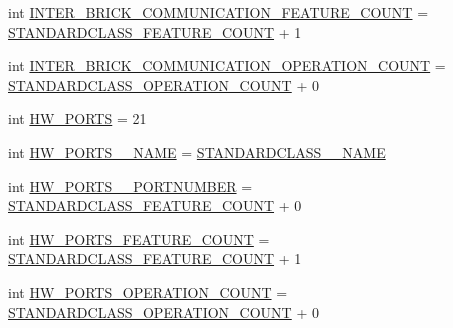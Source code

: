 \begin{DoxyCompactItemize}
\item 
int \hyperlink{interfaceshootingmachineemfmodel_1_1_shootingmachineemfmodel_package_a8d13017baf2c20e1387a03aa9657d5ff}{I\-N\-T\-E\-R\-\_\-\-B\-R\-I\-C\-K\-\_\-\-C\-O\-M\-M\-U\-N\-I\-C\-A\-T\-I\-O\-N\-\_\-\-F\-E\-A\-T\-U\-R\-E\-\_\-\-C\-O\-U\-N\-T} = \hyperlink{interfaceshootingmachineemfmodel_1_1_shootingmachineemfmodel_package_a14037f66989b3107e402142df96ee9aa}{S\-T\-A\-N\-D\-A\-R\-D\-C\-L\-A\-S\-S\-\_\-\-F\-E\-A\-T\-U\-R\-E\-\_\-\-C\-O\-U\-N\-T} + 1
\item 
int \hyperlink{interfaceshootingmachineemfmodel_1_1_shootingmachineemfmodel_package_afd388b80427475bafc3ae00abc93859e}{I\-N\-T\-E\-R\-\_\-\-B\-R\-I\-C\-K\-\_\-\-C\-O\-M\-M\-U\-N\-I\-C\-A\-T\-I\-O\-N\-\_\-\-O\-P\-E\-R\-A\-T\-I\-O\-N\-\_\-\-C\-O\-U\-N\-T} = \hyperlink{interfaceshootingmachineemfmodel_1_1_shootingmachineemfmodel_package_a2fe5d848cfe0a02fe5609e2c5ed7e7c7}{S\-T\-A\-N\-D\-A\-R\-D\-C\-L\-A\-S\-S\-\_\-\-O\-P\-E\-R\-A\-T\-I\-O\-N\-\_\-\-C\-O\-U\-N\-T} + 0
\item 
int \hyperlink{interfaceshootingmachineemfmodel_1_1_shootingmachineemfmodel_package_afa74b06d8a28f085369fdcb2b19b7b36}{H\-W\-\_\-\-P\-O\-R\-T\-S} = 21
\item 
int \hyperlink{interfaceshootingmachineemfmodel_1_1_shootingmachineemfmodel_package_a8c7830b95625a0ce6a38f99f0bbb4a6f}{H\-W\-\_\-\-P\-O\-R\-T\-S\-\_\-\-\_\-\-N\-A\-M\-E} = \hyperlink{interfaceshootingmachineemfmodel_1_1_shootingmachineemfmodel_package_a06475d7d54d52ee19b2aaf4d5d73c738}{S\-T\-A\-N\-D\-A\-R\-D\-C\-L\-A\-S\-S\-\_\-\-\_\-\-N\-A\-M\-E}
\item 
int \hyperlink{interfaceshootingmachineemfmodel_1_1_shootingmachineemfmodel_package_af1a55b03e332449551c73de215f7cbbf}{H\-W\-\_\-\-P\-O\-R\-T\-S\-\_\-\-\_\-\-P\-O\-R\-T\-N\-U\-M\-B\-E\-R} = \hyperlink{interfaceshootingmachineemfmodel_1_1_shootingmachineemfmodel_package_a14037f66989b3107e402142df96ee9aa}{S\-T\-A\-N\-D\-A\-R\-D\-C\-L\-A\-S\-S\-\_\-\-F\-E\-A\-T\-U\-R\-E\-\_\-\-C\-O\-U\-N\-T} + 0
\item 
int \hyperlink{interfaceshootingmachineemfmodel_1_1_shootingmachineemfmodel_package_a07e6faf7371ad8351da3b4600954f204}{H\-W\-\_\-\-P\-O\-R\-T\-S\-\_\-\-F\-E\-A\-T\-U\-R\-E\-\_\-\-C\-O\-U\-N\-T} = \hyperlink{interfaceshootingmachineemfmodel_1_1_shootingmachineemfmodel_package_a14037f66989b3107e402142df96ee9aa}{S\-T\-A\-N\-D\-A\-R\-D\-C\-L\-A\-S\-S\-\_\-\-F\-E\-A\-T\-U\-R\-E\-\_\-\-C\-O\-U\-N\-T} + 1
\item 
int \hyperlink{interfaceshootingmachineemfmodel_1_1_shootingmachineemfmodel_package_a5f85f99a2b80ea1b9f8c81dc620e69b3}{H\-W\-\_\-\-P\-O\-R\-T\-S\-\_\-\-O\-P\-E\-R\-A\-T\-I\-O\-N\-\_\-\-C\-O\-U\-N\-T} = \hyperlink{interfaceshootingmachineemfmodel_1_1_shootingmachineemfmodel_package_a2fe5d848cfe0a02fe5609e2c5ed7e7c7}{S\-T\-A\-N\-D\-A\-R\-D\-C\-L\-A\-S\-S\-\_\-\-O\-P\-E\-R\-A\-T\-I\-O\-N\-\_\-\-C\-O\-U\-N\-T} + 0

\end{DoxyCompactItemize}
